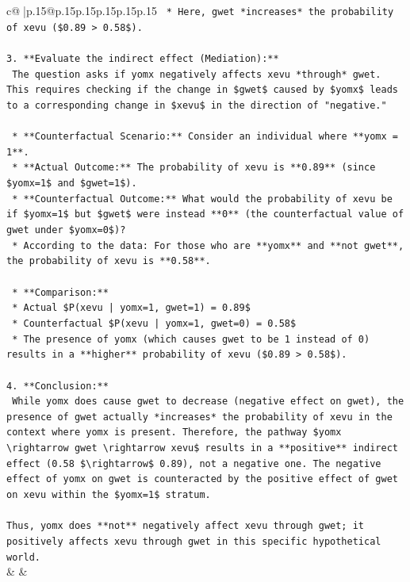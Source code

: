 \documentclass{article}
\begin{document}
{\begin{supertabular}{c@{$\;$}|p{.15\linewidth}@{}p{.15\linewidth}p{.15\linewidth}p{.15\linewidth}p{.15\linewidth}p{.15\linewidth}}
{{{\texttt{        *   Here, gwet *increases* the probability of xevu (\$0.89 > 0.58\$).} \\
\\ 
\texttt{3.  **Evaluate the indirect effect (Mediation):**} \\
\texttt{    The question asks if yomx negatively affects xevu *through* gwet. This requires checking if the change in \$gwet\$ caused by \$yomx\$ leads to a corresponding change in \$xevu\$ in the direction of "negative."} \\
\\ 
\texttt{    *   **Counterfactual Scenario:** Consider an individual where **yomx = 1**.} \\
\texttt{        *   **Actual Outcome:** The probability of xevu is **0.89** (since \$yomx=1\$ and \$gwet=1\$).} \\
\texttt{        *   **Counterfactual Outcome:** What would the probability of xevu be if \$yomx=1\$ but \$gwet\$ were instead **0** (the counterfactual value of gwet under \$yomx=0\$)?} \\
\texttt{            *   According to the data: For those who are **yomx** and **not gwet**, the probability of xevu is **0.58**.} \\
\\ 
\texttt{    *   **Comparison:**} \\
\texttt{        *   Actual \$P(xevu | yomx=1, gwet=1) = 0.89\$} \\
\texttt{        *   Counterfactual \$P(xevu | yomx=1, gwet=0) = 0.58\$} \\
\texttt{        *   The presence of yomx (which causes gwet to be 1 instead of 0) results in a **higher** probability of xevu (\$0.89 > 0.58\$).} \\
\\ 
\texttt{4.  **Conclusion:**} \\
\texttt{    While yomx does cause gwet to decrease (negative effect on gwet), the presence of gwet actually *increases* the probability of xevu in the context where yomx is present. Therefore, the pathway \$yomx \textbackslash{}rightarrow gwet \textbackslash{}rightarrow xevu\$ results in a **positive** indirect effect (0.58 \$\textbackslash{}rightarrow\$ 0.89), not a negative one. The negative effect of yomx on gwet is counteracted by the positive effect of gwet on xevu within the \$yomx=1\$ stratum.} \\
\\ 
\texttt{Thus, yomx does **not** negatively affect xevu through gwet; it positively affects xevu through gwet in this specific hypothetical world.} \\
            }
        }
    }
    & & \\ \\


\end{supertabular}}
\end{document}
